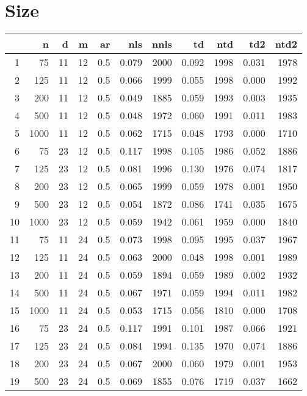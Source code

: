\documentclass{article}
\begin{document}
\section{Size}
\begin{tabular}{rrrrrrrrrrr}
  \hline
 & n & d & m & ar & nls & nnls & td & ntd & td2 & ntd2 \\ 
  \hline
1 & 75 & 11 & 12 & 0.5 & 0.079 & 2000 & 0.092 & 1998 & 0.031 & 1978 \\ 
  2 & 125 & 11 & 12 & 0.5 & 0.066 & 1999 & 0.055 & 1998 & 0.000 & 1992 \\ 
  3 & 200 & 11 & 12 & 0.5 & 0.049 & 1885 & 0.059 & 1993 & 0.003 & 1935 \\ 
  4 & 500 & 11 & 12 & 0.5 & 0.048 & 1972 & 0.060 & 1991 & 0.011 & 1983 \\ 
  5 & 1000 & 11 & 12 & 0.5 & 0.062 & 1715 & 0.048 & 1793 & 0.000 & 1710 \\ 
   \hline
6 & 75 & 23 & 12 & 0.5 & 0.117 & 1998 & 0.105 & 1986 & 0.052 & 1886 \\ 
  7 & 125 & 23 & 12 & 0.5 & 0.081 & 1996 & 0.130 & 1976 & 0.074 & 1817 \\ 
  8 & 200 & 23 & 12 & 0.5 & 0.065 & 1999 & 0.059 & 1978 & 0.001 & 1950 \\ 
  9 & 500 & 23 & 12 & 0.5 & 0.054 & 1872 & 0.086 & 1741 & 0.035 & 1675 \\ 
  10 & 1000 & 23 & 12 & 0.5 & 0.059 & 1942 & 0.061 & 1959 & 0.000 & 1840 \\ 
   \hline
11 & 75 & 11 & 24 & 0.5 & 0.073 & 1998 & 0.095 & 1995 & 0.037 & 1967 \\ 
  12 & 125 & 11 & 24 & 0.5 & 0.063 & 2000 & 0.048 & 1998 & 0.001 & 1989 \\ 
  13 & 200 & 11 & 24 & 0.5 & 0.059 & 1894 & 0.059 & 1989 & 0.002 & 1932 \\ 
  14 & 500 & 11 & 24 & 0.5 & 0.067 & 1971 & 0.059 & 1994 & 0.011 & 1982 \\ 
  15 & 1000 & 11 & 24 & 0.5 & 0.053 & 1715 & 0.056 & 1810 & 0.000 & 1708 \\ 
   \hline
16 & 75 & 23 & 24 & 0.5 & 0.117 & 1991 & 0.101 & 1987 & 0.066 & 1921 \\ 
  17 & 125 & 23 & 24 & 0.5 & 0.084 & 1994 & 0.135 & 1970 & 0.074 & 1886 \\ 
  18 & 200 & 23 & 24 & 0.5 & 0.067 & 2000 & 0.060 & 1979 & 0.001 & 1953 \\ 
  19 & 500 & 23 & 24 & 0.5 & 0.069 & 1855 & 0.076 & 1719 & 0.037 & 1662 \\ 

\end{tabular}
\end{document}
